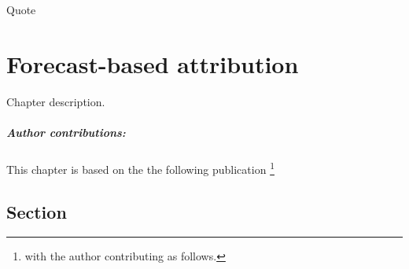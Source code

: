 \begin{savequote}[8cm]
    Quote
\end{savequote}
    
\chapter{\label{ch4}Forecast-based attribution} 

Chapter description.
\small\paragraph{Author contributions:} This chapter is based on the the following publication \footnote{with the author contributing as follows.} \par\vspace{1em}

\clearpage

\minitoc

\clearpage

\section{Section}

    \blindtext